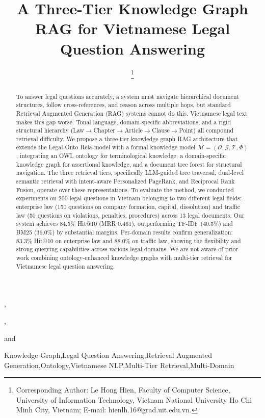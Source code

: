 \documentclass{IOS-Book-Article}
\providecommand{\runtitle}[1]{}
\begin{document}
\pagestyle{headings}
\def\thepage{}

\begin{frontmatter}

\title{A Three-Tier Knowledge Graph RAG for Vietnamese Legal Question Answering}

\author[A]{ %
\thanks{Corresponding Author: Le Hong Hien, Faculty of Computer Science, University of Information Technology, Vietnam National University Ho Chi Minh City, Vietnam; E-mail: hienlh.16@grad.uit.edu.vn.}},
\author[A]{ },
\author[B]{ }
and
\author[A]{ }

\runtitle{Three-Tier KG RAG for Vietnamese Legal QA}
\address[A]{Faculty of Computer Science, University of Information Technology, Vietnam National University Ho Chi Minh City, Vietnam}
\address[B]{School of Computer Science, University College Dublin, Ireland}

\begin{abstract}
To answer legal questions accurately, a system must navigate hierarchical document structures, follow cross-references, and reason across multiple hops, but standard Retrieval Augmented Generation (RAG) systems cannot do this. Vietnamese legal text makes this gap worse. Tonal language, domain-specific abbreviations, and a rigid structural hierarchy (Law$\to$Chapter$\to$Article$\to$Clause$\to$Point) all compound retrieval difficulty. We propose a three-tier knowledge graph RAG architecture that extends the Legal-Onto Rela-model with a formal knowledge model $\mathcal{M} = (\mathcal{O}, \mathcal{G}, \mathcal{T}, \Phi)$, integrating an OWL ontology for terminological knowledge, a domain-specific knowledge graph for assertional knowledge, and a document tree forest for structural navigation. The three retrieval tiers, specifically LLM-guided tree traversal, dual-level semantic retrieval with intent-aware Personalized PageRank, and Reciprocal Rank Fusion, operate over these representations. To evaluate the method, we conducted experiments on 200 legal questions in Vietnam belonging to two different legal fields: enterprise law (150 questions on company formation, capital, dissolution) and traffic law (50 questions on violations, penalties, procedures) across 13 legal documents. Our system achieves 84.5\% Hit@10 (MRR 0.461), outperforming TF-IDF (40.5\%) and BM25 (36.0\%) by substantial margins. Per-domain results confirm generalization: 83.3\% Hit@10 on enterprise law and 88.0\% on traffic law, showing the flexibility and strong querying capabilities across various legal domains. We are not aware of prior work combining ontology-enhanced knowledge graphs with multi-tier retrieval for Vietnamese legal question answering.
\end{abstract}

\begin{keyword}
Knowledge Graph\sep Legal Question Answering\sep Retrieval Augmented Generation\sep Ontology\sep Vietnamese NLP\sep Multi-Tier Retrieval\sep Multi-Domain
\end{keyword}

\end{frontmatter}
\end{document}

